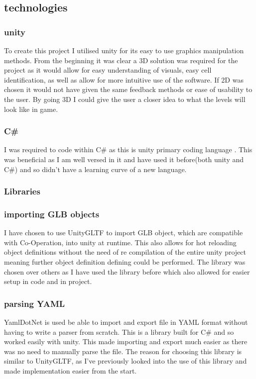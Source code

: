 

\subsection{technologies}
\subsubsection{unity}
To create this project I utilised unity for its easy to use graphics manipulation methods. From the beginning it was clear a 3D solution was required for the project as it would allow for easy understanding of visuals, easy cell identification, as well as allow for more intuitive use of the software. If 2D was chosen it would not have given the same feedback methods or ease of usability to the user. By going 3D I could give the user a closer idea to what the levels will look like in game.
\subsubsection{C\#}
I was required to code within C\# as this is unity primary coding language . This was beneficial as I am well versed in it and have used it before(both unity and C\#) and so didn't have a learning curve of a new language.

\subsubsection{Libraries}
\subsubsection*{importing GLB objects}
I have chosen to use UnityGLTF\cite{siccity_2021_github} to import GLB object, which are compatible with Co-Operation, into unity at runtime. This also allows for hot reloading object definitions without the need of re compilation of the entire unity project meaning further object definition defining could be performed. The library was chosen over others as I have used the library before which also allowed for easier setup in code and in project.\\
\subsubsection*{parsing YAML}
YamlDotNet\cite{aubry_2024_aaubryyamldotnet} is used be able to import and export file in YAML format without having to write a parser from scratch. This is a library built for C\# and so worked easily with unity. This made importing and export much easier as there was no need to manually parse the file. The reason for choosing this library is similar to UnityGLTF, as I've previously looked into the use of this library and made implementation easier from the start.\\

